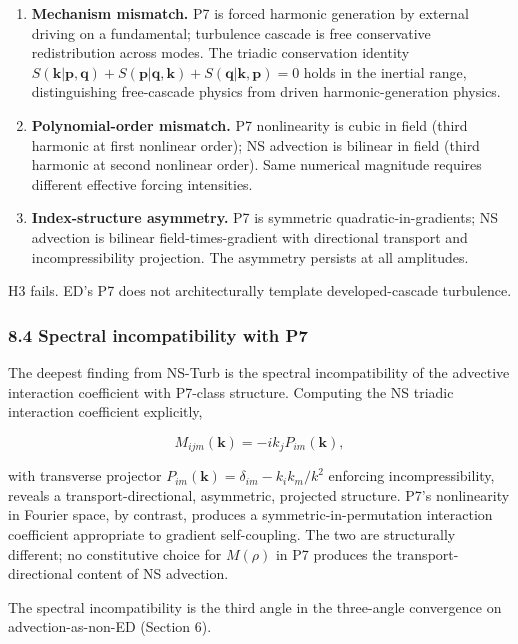 \documentclass[
  11pt,a4paper]{article}
\begin{document}
\begin{enumerate}
\def\labelenumi{\arabic{enumi}.}
\item
  \textbf{Mechanism mismatch.} P7 is forced harmonic generation by
  external driving on a fundamental; turbulence cascade is free
  conservative redistribution across modes. The triadic conservation
  identity
  \(S(\mathbf{k}|\mathbf{p},\mathbf{q}) + S(\mathbf{p}|\mathbf{q},\mathbf{k}) + S(\mathbf{q}|\mathbf{k},\mathbf{p}) = 0\)
  holds in the inertial range, distinguishing free-cascade physics from
  driven harmonic-generation physics.
\item
  \textbf{Polynomial-order mismatch.} P7 nonlinearity is cubic in field
  (third harmonic at first nonlinear order); NS advection is bilinear in
  field (third harmonic at second nonlinear order). Same numerical
  magnitude requires different effective forcing intensities.
\item
  \textbf{Index-structure asymmetry.} P7 is symmetric
  quadratic-in-gradients; NS advection is bilinear field-times-gradient
  with directional transport and incompressibility projection. The
  asymmetry persists at all amplitudes.
\end{enumerate}

H3 fails. ED's P7 does not architecturally template developed-cascade
turbulence.

\subsubsection{8.4 Spectral incompatibility with
P7}\label{spectral-incompatibility-with-p7}

The deepest finding from NS-Turb is the spectral incompatibility of the
advective interaction coefficient with P7-class structure. Computing the
NS triadic interaction coefficient explicitly,

\[M_{ijm}(\mathbf{k}) = -i k_j P_{im}(\mathbf{k}),\]

with transverse projector
\(P_{im}(\mathbf{k}) = \delta_{im} - k_i k_m/k^2\) enforcing
incompressibility, reveals a transport-directional, asymmetric,
projected structure. P7's nonlinearity in Fourier space, by contrast,
produces a symmetric-in-permutation interaction coefficient appropriate
to gradient self-coupling. The two are structurally different; no
constitutive choice for \(M(\rho)\) in P7 produces the
transport-directional content of NS advection.

The spectral incompatibility is the third angle in the three-angle
convergence on advection-as-non-ED (Section 6).
\end{document}

